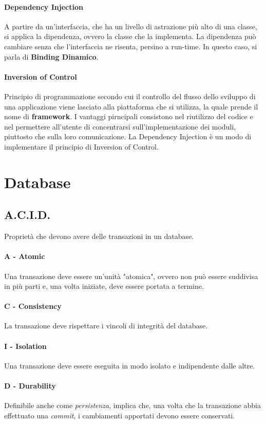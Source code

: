 \documentclass{article}
\begin{document}
        \paragraph{Dependency Injection} A partire da un'interfaccia, che ha un livello di astrazione più alto di una classe, si applica la dipendenza, ovvero la classe che la implementa. La dipendenza può cambiare senza che l'interfaccia ne risenta, persino a run-time. In questo caso, si parla di \textbf{Binding Dinamico}.
        \paragraph{Inversion of Control} Principio di programmazione secondo cui il controllo del flusso dello sviluppo di una applicazione viene lasciato alla piattaforma che si utilizza, la quale prende il nome di \textbf{framework}. I vantaggi pirncipali consistono nel riutilizzo del codice e nel permettere all'utente di concentrarsi sull'implementazione dei moduli, piuttosto che sulla loro comunicazione. La Dependency Injection è un modo di implementare il principio di Inversion of Control.

\section{Database}
    \subsection{A.C.I.D.}
        Proprietà che devono avere delle transazioni in un database.
        \paragraph{A - Atomic} Una transazione deve essere un'unità "atomica", ovvero non può essere suddivisa in più parti e, una volta iniziate, deve essere portata a termine.
        \paragraph{C - Consistency} La transazione deve rispettare i vincoli di integrità del database.
        \paragraph{I - Isolation} Una transazione deve essere eseguita in modo isolato e indipendente dalle altre.
        \paragraph{D - Durability} Definibile anche come \textit{persistenza}, implica che, una volta che la transazione abbia effettuato una \textit{commit}, i cambiamenti apportati devono essere conservati. 
    
\end{document}
